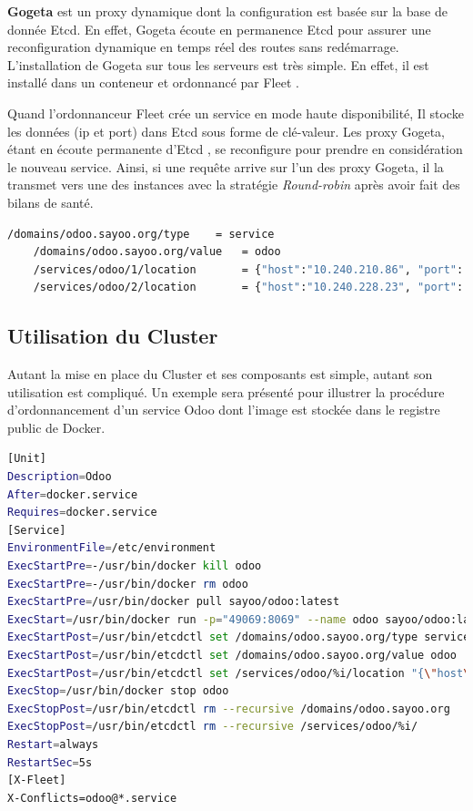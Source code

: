 \begin{onehalfspace}
\textbf{Gogeta} est un proxy dynamique dont la configuration est basée sur la base de donnée Etcd. En effet, Gogeta écoute en permanence Etcd pour assurer une reconfiguration dynamique en temps réel des routes sans redémarrage. L'installation de Gogeta sur tous les serveurs est très simple. En effet, il est installé dans un conteneur et ordonnancé par Fleet \cite{gogeta}.

Quand l'ordonnanceur Fleet crée un service en mode haute disponibilité, Il stocke les données (\acrshort{ip} et port) dans Etcd sous forme de clé-valeur. Les proxy Gogeta, étant en écoute permanente d'Etcd , se reconfigure pour prendre en considération le nouveau service. Ainsi, si une requête arrive sur l'un des proxy Gogeta, il la transmet vers une des instances avec la stratégie \emph{Round-robin} après avoir fait des bilans de santé.

\begin{lstlisting}[language=bash,caption=Contenu de la base de donnée Etcd]
	/domains/odoo.sayoo.org/type 	= service
	/domains/odoo.sayoo.org/value 	= odoo
	/services/odoo/1/location		= {"host":"10.240.210.86", "port": 42654}
	/services/odoo/2/location		= {"host":"10.240.228.23", "port": 42669}
\end{lstlisting}

\subsection{Utilisation du Cluster}

Autant la mise en place du Cluster et ses composants est simple, autant son utilisation est compliqué. Un exemple sera présenté pour illustrer la procédure d'ordonnancement d'un service Odoo dont l'image est stockée dans le registre public de Docker.

	\begin{lstlisting}[language=bash,caption=Fichier d'ordonnancement d'un service Odoo]
[Unit]
Description=Odoo
After=docker.service
Requires=docker.service
[Service]
EnvironmentFile=/etc/environment
ExecStartPre=-/usr/bin/docker kill odoo
ExecStartPre=-/usr/bin/docker rm odoo
ExecStartPre=/usr/bin/docker pull sayoo/odoo:latest
ExecStart=/usr/bin/docker run -p="49069:8069" --name odoo sayoo/odoo:latest
ExecStartPost=/usr/bin/etcdctl set /domains/odoo.sayoo.org/type service
ExecStartPost=/usr/bin/etcdctl set /domains/odoo.sayoo.org/value odoo
ExecStartPost=/usr/bin/etcdctl set /services/odoo/%i/location "{\"host\":\"${COREOS_PRIVATE_IPV4}\", \"port\": 49069}"
ExecStop=/usr/bin/docker stop odoo
ExecStopPost=/usr/bin/etcdctl rm --recursive /domains/odoo.sayoo.org
ExecStopPost=/usr/bin/etcdctl rm --recursive /services/odoo/%i/
Restart=always
RestartSec=5s
[X-Fleet]
X-Conflicts=odoo@*.service
	\end{lstlisting}



\end{onehalfspace}
